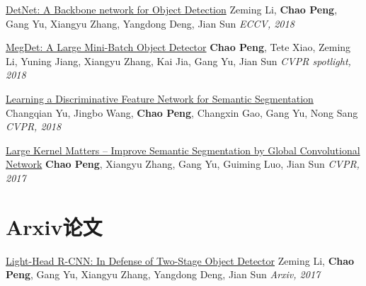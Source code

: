 \documentclass[]{friggeri-cv}
\begin{document}
\href{https://arxiv.org/pdf/1804.06215.pdf}{DetNet: A Backbone network for Object Detection} \newline
Zeming Li, \textbf{Chao Peng}, Gang Yu, Xiangyu Zhang, Yangdong Deng, Jian Sun  \newline
\emph{ECCV, 2018}

\href{https://arxiv.org/pdf/1711.07240.pdf}{MegDet: A Large Mini-Batch Object Detector\qquad } \newline
\textbf{Chao Peng}, Tete Xiao, Zeming Li, Yuning Jiang, Xiangyu Zhang, Kai Jia, Gang Yu, \newline
Jian Sun \newline
\emph{CVPR spotlight, 2018}

\href{https://arxiv.org/pdf/1804.09337.pdf}{Learning a Discriminative Feature Network for Semantic Segmentation}\newline
Changqian Yu, Jingbo Wang, \textbf{Chao Peng}, Changxin Gao, Gang Yu, Nong Sang
\newline
\emph{CVPR, 2018}

\href{https://arxiv.org/pdf/1703.02719.pdf}{Large Kernel Matters -- Improve Semantic Segmentation by Global Convolutional Network}
\textbf{Chao Peng}, Xiangyu Zhang, Gang Yu, Guiming Luo, Jian Sun \newline
\emph{CVPR, 2017}

\section{Arxiv论文}
\href{https://arxiv.org/pdf/1711.07264.pdf}{Light-Head R-CNN: In Defense of Two-Stage Object Detector} \newline
Zeming Li, \textbf{Chao Peng}, Gang Yu, Xiangyu Zhang, Yangdong Deng, Jian Sun  \newline
\emph{Arxiv, 2017}


% 
\end{document}
